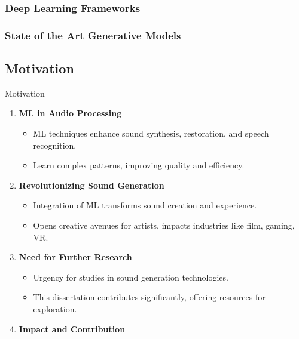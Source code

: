 \begin{frame}
    \frametitle{Deep Learning Frameworks}
\end{frame}

\begin{frame}
    \frametitle{State of the Art Generative Models}
\end{frame}

\subsection{Motivation}

\begin{frame}{Motivation}
    \begin{enumerate}
        \item \textbf{ML in Audio Processing}
              \begin{itemize}
                  \item ML techniques enhance sound synthesis, restoration, and speech recognition.
                  \item Learn complex patterns, improving quality and efficiency.
              \end{itemize}
        \item \textbf{Revolutionizing Sound Generation}
              \begin{itemize}
                  \item Integration of ML transforms sound creation and experience.
                  \item Opens creative avenues for artists, impacts industries like film, gaming, VR.
              \end{itemize}
        \item \textbf{Need for Further Research}
              \begin{itemize}
                  \item Urgency for studies in sound generation technologies.
                  \item This dissertation contributes significantly, offering resources for exploration.
              \end{itemize}
        \item \textbf{Impact and Contribution}
              \begin{itemize}

\end{itemize}
\end{enumerate}
\end{frame}
